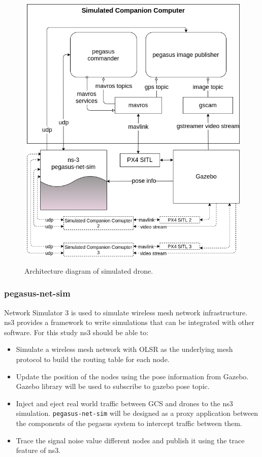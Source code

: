 \begin{figure}
	\centering
	\caption[Pegasus GCS system simulation overview]{\small Architecture diagram of simulated drone.}
	\includegraphics[width=5in]{figures/methodology/methodology-drone-components-simulated}
	\label{fig:drone-components-simulated}
\end{figure}


\subsubsection{pegasus-net-sim}

Network Simulator 3 is used to simulate wireless mesh network infrastructure. ns3 provides a framework to write simulations that can be integrated with other software. For this study ns3 should be able to:
\begin{itemize}
	\item Simulate a wireless mesh network with OLSR as the underlying mesh protocol to build the routing table for each node.
	\item Update the position of the nodes using the pose information from Gazebo. Gazebo library will be used to subscribe to gazebo pose topic.
	\item Inject and eject real world traffic between GCS and drones to the ns3 simulation. \texttt{pegasus-net-sim} will be designed as a proxy application between the components of the pegasus system to intercept traffic between them.
	\item Trace the signal noise value different nodes and publish it using the trace feature of ns3.
\end{itemize}

